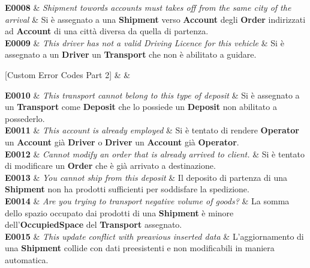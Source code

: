 {  \textbf{E0008} &
  {\footnotesize
    \textit{Shipment towords accounts must takes off from the same city of the arrival} } &
  {\footnotesize
    Si è assegnato a una \textbf{Shipment} verso \textbf{Account} degli \textbf{Order} indirizzati ad \textbf{Account} di una città diversa da quella di partenza.} \\

  \textbf{E0009} &
  {\footnotesize
    \textit{This driver has not a valid Driving Licence for this vehicle} } &
  {\footnotesize
    Si è assegnato a un \textbf{Driver} un \textbf{Transport} che non è abilitato a guidare.} \\
    
}

[Custom Error Codes Part 2]{ &  & }{

  \textbf{E0010} &
  {\footnotesize
    \textit{This transport cannot belong to this type of deposit} } &
  {\footnotesize
    Si è assegnato a un \textbf{Transport} come \textbf{Deposit} che lo possiede un \textbf{Deposit} non abilitato a possederlo.} \\

  \textbf{E0011} &
  {\footnotesize
    \textit{This account is already employed} } &
  {\footnotesize  
    Si è tentato di rendere \textbf{Operator} un \textbf{Account} già \textbf{Driver} o \textbf{Driver} un \textbf{Account} già \textbf{Operator}.} \\

  \textbf{E0012} &
  {\footnotesize
    \textit{ Cannot modify an order that is already arrived to client.} } &
  {\footnotesize
    Si è tentato di modificare un \textbf{Order} che è già arrivato a destinazione.} \\

  \textbf{E0013} &
  {\footnotesize 
    \textit{You cannot ship from this deposit} } &
  {\footnotesize
    Il deposito di partenza di una \textbf{Shipment} non ha prodotti sufficienti per soddisfare la spedizione.} \\  

  \textbf{E0014} &
  {\footnotesize
    \textit{Are you trying to transport negative volume of goods?} } &
  {\footnotesize
    La somma dello spazio occupato dai prodotti di una \textbf{Shipment} è minore dell'\textbf{OccupiedSpace} del \textbf{Transport} assegnato.} \\

  \textbf{E0015} &
  {\footnotesize
    \textit{This update conflict with preavious inserted data}} &
  {\footnotesize
    L'aggiornamento di una \textbf{Shipment} collide con dati preesistenti e non modificabili in maniera automatica.} \\

}

